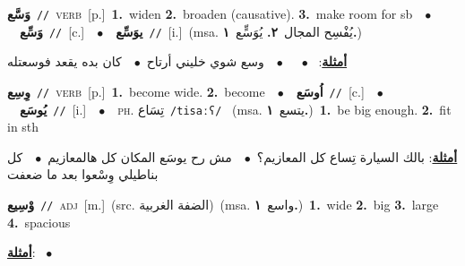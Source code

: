 \documentclass[10pt,a4paper,twoside]{article} %
\begin{document}
\begin{multicols}{2}
{\setlength\topsep{0pt}\textbf{\foreignlanguage{arabic}{وَسَّع}}\ {\color{gray}\texttt{//}\color{black}}\ \textsc{verb}\ [p.]\ \textbf{1.}~widen  \textbf{2.}~broaden (causative).  \textbf{3.}~make room for sb\ \ $\bullet$\ \ \setlength\topsep{0pt}\textbf{\foreignlanguage{arabic}{وَسِّع}}\ {\color{gray}\texttt{//}\color{black}}\ [c.]\ \ $\bullet$\ \ \setlength\topsep{0pt}\textbf{\foreignlanguage{arabic}{يوَسِّع}}\ {\color{gray}\texttt{//}\color{black}}\ [i.]\ \color{gray}(msa. \foreignlanguage{arabic}{يُفْسِح المجال}~\foreignlanguage{arabic}{\textbf{٢.}}  \foreignlanguage{arabic}{يُوَسٍّع}~\foreignlanguage{arabic}{\textbf{١.}})\color{black}\  \begin{flushright}\color{gray}\foreignlanguage{arabic}{\textbf{\underline{\foreignlanguage{arabic}{أمثلة}}}: \ $\bullet$\ \  \ $\bullet$\ \  وسع شوي خليني أرتاح\ $\bullet$\ \  كان بده يقعد فوسعتله}\end{flushright}\color{black}} \vspace{2mm}

{\setlength\topsep{0pt}\textbf{\foreignlanguage{arabic}{وِسِع}}\ {\color{gray}\texttt{//}\color{black}}\ \textsc{verb}\ [p.]\ \textbf{1.}~become wide.  \textbf{2.}~become\ \ $\bullet$\ \ \setlength\topsep{0pt}\textbf{\foreignlanguage{arabic}{اُوسَع}}\ {\color{gray}\texttt{//}\color{black}}\ [c.]\ \ $\bullet$\ \ \setlength\topsep{0pt}\textbf{\foreignlanguage{arabic}{يُوسَع}}\ {\color{gray}\texttt{//}\color{black}}\ [i.]\ \ $\bullet$\ \ \textsc{ph.} \color{gray} \foreignlanguage{arabic}{تِسَاع}\color{black}\ {\color{gray}\texttt{/{\sffamily tisaːʕ}/}\color{black}}\ \color{gray} (msa. \foreignlanguage{arabic}{يتسع}~\foreignlanguage{arabic}{\textbf{١.}})\color{black}\ \textbf{1.}~be big enough.  \textbf{2.}~fit in sth\  \begin{flushright}\color{gray}\foreignlanguage{arabic}{\textbf{\underline{\foreignlanguage{arabic}{أمثلة}}}: بالك السيارة تِساع كل المعازيم؟\ $\bullet$\ \  مش رح يوسَع المكان كل هالمعازيم\ $\bullet$\ \  كل بناطيلي وِسْعوا بعد ما ضعفت}\end{flushright}\color{black}} \vspace{2mm}

{\setlength\topsep{0pt}\textbf{\foreignlanguage{arabic}{وْسِيع}}\ {\color{gray}\texttt{//}\color{black}}\ \textsc{adj}\ [m.]\ (src. \color{gray}\foreignlanguage{arabic}{الضفة الغربية}\color{black})\ \color{gray}(msa. \foreignlanguage{arabic}{واسع}~\foreignlanguage{arabic}{\textbf{١.}})\color{black}\ \textbf{1.}~wide  \textbf{2.}~big  \textbf{3.}~large  \textbf{4.}~spacious\  \begin{flushright}\color{gray}\foreignlanguage{arabic}{\textbf{\underline{\foreignlanguage{arabic}{أمثلة}}}: \ $\bullet$\ \  }\end{flushright}\color{black}} \vspace{2mm}


\end{multicols}
\end{document}
